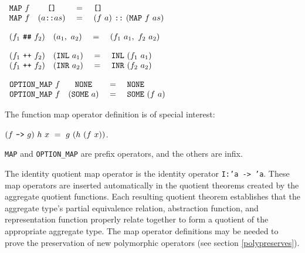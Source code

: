 \documentclass[envcountsame,runningheads]{llncs}
\newcommand{\quotient}{partial equivalence}
\begin{document}
\begin{definition}
\label{listmap}
$\begin{array}[t]{lccl}
\mbox{\tt MAP}\ f & \mbox{\tt []} & \ = \  & \mbox{\tt []} \\
\mbox{\tt MAP}\ f & (a \mbox{\tt ::} as) & \ = \ 
   & (f\ a)\ \mbox{\tt ::}\ (\mbox{\tt MAP}\ f\ as)
\end{array}$
\end{definition}

\begin{definition}
\label{pairmap}
$\begin{array}[t]{lccl}
(f_1\ \mbox{\tt \#\#}\ f_2) & (a_1, \ a_2) & \ = \ 
   & (f_1\ a_1, \ f_2\ a_2)
\end{array}$
\end{definition}

\begin{definition}
\label{summap}
$\begin{array}[t]{lccl}
(f_1\ \mbox{\tt ++}\ f_2) & (\mbox{\tt INL}\ a_1) & \ = \ 
   & \mbox{\tt INL}\ (f_1\ a_1)  \\
(f_1\ \mbox{\tt ++}\ f_2) & (\mbox{\tt INR}\ a_2) & \ = \ 
   & \mbox{\tt INR}\ (f_2\ a_2)  
\end{array}$
\end{definition}

\begin{definition}
\label{optionmap}
$\begin{array}[t]{lccl}
\mbox{\tt OPTION\_MAP}\ f & \mbox{\tt NONE} & \ = \ 
   & \mbox{\tt NONE}  \\
\mbox{\tt OPTION\_MAP}\ f & (\mbox{\tt SOME}\ a) & \ = \ 
   & \mbox{\tt SOME}\ (f\ a)
\end{array}$
\end{definition}

The
function map operator definition is of special interest:

\begin{definition}
\label{funmap}
$(f\ \mbox{\tt -->}\ g)\ h\ x \ = \ 
g\ (h\ (f\ x))$.
\end{definition}

\noindent
{\tt MAP} and {\tt OPTION\_MAP} are prefix operators,
and the others are infix.

The identity quotient map operator is the identity operator {\tt I:'a -> 'a}.
These map operators are inserted automatically
in the quotient theorems created by the aggregate quotient functions. 
Each resulting quotient theorem establishes that the aggregate type's
\quotient{} relation,
abstraction function, and representation function properly relate together
to form a quotient of the appropriate aggregate type.
The map operator definitions
may be needed to prove 
the preservation
of new polymorphic operators (see section \ref{polypreserves}).
\end{document}

